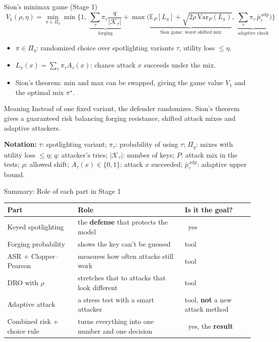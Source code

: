 \documentclass[aspectratio=169,11pt]{beamer}
\providecommand{\notation}[1]{\par\vfill{\scriptsize\textcolor{gray!80!black}{\textbf{Notation:} #1}}}
\begin{document}
\begin{frame}{Sion's minimax game (Stage 1)}
  \footnotesize
  \[
    \boxed{\;
    V_1(\rho,\eta) = \min_{\pi \in \Pi_\eta} \min\Bigg\{1,\;
    \underbrace{\sum_\tau \pi_\tau \frac{q}{|\mathcal{K}_\tau|}}_{\text{forging}}
    + \max\Big(
    \underbrace{\mathbb{E}_P[L_\pi] + \sqrt{2\rho\,\mathrm{Var}_P(L_\pi)}}_{\text{Sion game: worst shifted mix}},\;
    \underbrace{\sum_\tau \pi_\tau\, \bar p^{\,\mathrm{adp}}_\tau}_{\text{adaptive check}}
    \Big)\Bigg\}\;}
  \]
  \begin{itemize}
    \item $\pi \in \Pi_\eta$: randomized choice over spotlighting variants $\tau$, utility loss $\le \eta$.
    \item $L_\pi(x) = \sum_\tau \pi_\tau A_\tau(x)$: chance attack $x$ succeeds under the mix.
    \item Sion's theorem: min and max can be swapped, giving the game value $V_1$ and the optimal mix $\pi^\star$.
  \end{itemize}
  \begin{block}{Meaning}
    Instead of one fixed variant, the defender randomizes. Sion's theorem gives a guaranteed risk balancing forging resistance, shifted attack mixes and adaptive attackers.
  \end{block}
  \notation{$\tau$: spotlighting variant; $\pi_\tau$: probability of using $\tau$; $\Pi_\eta$: mixes with utility loss $\le\eta$; $q$: attacker's tries; $|\mathcal{K}_\tau|$: number of keys; $P$: attack mix in the tests; $\rho$: allowed shift; $A_\tau(x)\in\{0,1\}$: attack $x$ succeeded; $\bar p^{\,\mathrm{adp}}_\tau$: adaptive upper bound.}
\end{frame}

\begin{frame}{Summary: Role of each part in Stage 1}
  \centering
  \small
  \renewcommand{\arraystretch}{1.3}
  \begin{tabular}{@{}p{} p{} p{}@{}}
    \toprule
    \textbf{Part} & \textbf{Role} & \textbf{Is it the goal?} \\
    \midrule
    Keyed spotlighting & the \textbf{defense} that protects the model & \textcolor{themeExample}{\pmb{\checkmark}}~yes \\
    Forging probability & shows the key can't be guessed & tool \\
    ASR + Clopper--Pearson & measures how often attacks still work & tool \\
    DRO with $\rho$ & stretches that to attacks that look different & tool \\
    Adaptive attack & a stress test with a smart attacker & tool, \textbf{not} a new attack method \\
    Combined risk + choice rule & turns everything into one number and one decision & \textcolor{themeExample}{\pmb{\checkmark}}~yes, the \textbf{result} \\
    \bottomrule
  \end{tabular}
\end{frame}
\end{document}
